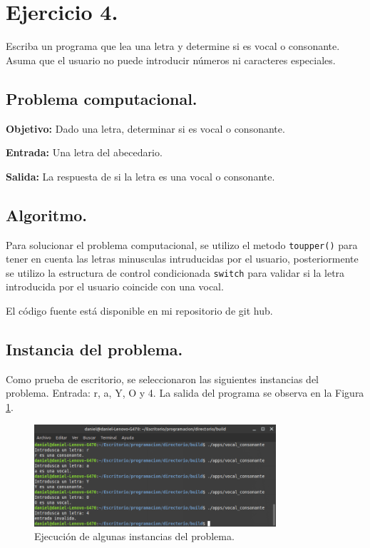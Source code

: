 \documentclass[12pt,letterpaper]{article}
\begin{document}
\section{Ejercicio 4.}

Escriba un programa que lea una letra y determine si es vocal o consonante. Asuma que el usuario no puede introducir n\'umeros ni caracteres especiales.

\subsection{Problema computacional.}
\textbf{Objetivo:} Dado una letra, determinar si es vocal o consonante.

\textbf{Entrada:} Una letra del abecedario.

\textbf{Salida:} La respuesta de si la letra es una vocal o consonante.

\subsection{Algoritmo.}
Para solucionar el problema computacional, se utilizo el metodo \texttt{toupper()} para tener en cuenta las letras minusculas intruducidas por el usuario, posteriormente se utilizo la estructura de control condicionada \texttt{switch} para validar si la letra introducida por el usuario coincide con una vocal.


El código fuente está disponible en mi repositorio de git hub. \cite{url:vocal_consonante}

\subsection{Instancia del problema.}
Como prueba de escritorio, se seleccionaron las siguientes instancias del problema. Entrada: r, a, Y, O y 4. La salida del programa se observa en la Figura \ref{fig:vocal_consonante}.
\begin{figure}[ht!]
  \centering
  \includegraphics[width=0.8\textwidth]{figures/vocal_consonante}
  \caption{Ejecución de algunas instancias del problema.}
  \label{fig:vocal_consonante}
\end{figure}
\end{document}
